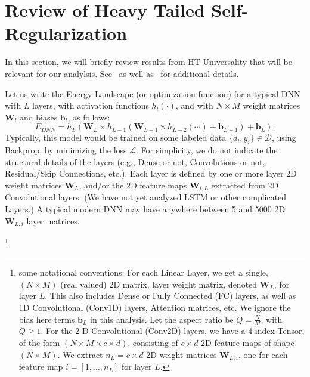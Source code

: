 
\section{Review of Heavy Tailed Self-Regularization}
\label{sxn:theory-review}

In this section, we will briefly review results from HT Universality that will be relevant for our analylsis.
See~\cite{SornetteBook,BouchaudPotters03} as well as~\cite{MM18_TR} for additional details.

Let us write the Energy Landscape (or optimization function) for a typical DNN with $L$ layers, with activation functions $h_{l}(\cdot)$, and with $N\times M$ weight matrices $\mathbf{W}_{l}$ and biases $\mathbf{b}_{l}$, as follows:
\begin{equation}
E_{DNN}=h_{L}(\mathbf{W}_{L}\times h_{L-1}(\mathbf{W}_{L-1}\times h_{L-2}(\cdots)+\mathbf{b}_{L-1})+\mathbf{b}_{L})  .
\label{eqn:dnn_energy}
\end{equation}
Typically, this model would be trained on some labeled data $\{d_{i},y_{i}\}\in\mathcal{D}$, using Backprop, by minimizing the loss $\mathcal{L}$.
For simplicity, we do not indicate the structural details of the layers (e.g., Dense or not, Convolutions or not, Residual/Skip Connections, etc.). 
Each layer is defined by one or more layer 2D weight matrices $\mathbf{W}_{L}$, and/or the 2D feature maps $\mathbf{W}_{i,L}$ extracted from 2D Convolutional layers.
(We have not yet analyzed LSTM or other complicated Layers.) 
A typical modern DNN may have anywhere between 5 and 5000 2D $\mathbf{W}_{L,i}$ layer matrices.  

\footnote{some notational conventions:
For each Linear Layer, we get a  single, $(N\times M)$ (real valued) 2D matrix, layer weight matrix, denoted $\mathbf{W}_{L}$, for layer $L$.  
This also includes Dense or Fully Connected (FC) layers, as well as 1D Convolutional (Conv1D) layers, Attention matrices, etc.
We ignore the bias here terms $\mathbf{b}_{L}$ in this analysis. 
Let the aspect ratio be $Q=\frac{N}{M}$, with $Q\ge 1$.
For the 2-D Convolutional (Conv2D) layers, we have a 4-index Tensor, of the form $(N\times M \times c\times d)$, consisting
of $c\times d$ 2D feature maps of shape $(N\times M)$.    
We  extract $n_{L}=c\times d$  2D  weight matrices $\mathbf{W}_{L,i}$, one for each feature map $i=[1,\dots,n_{L}]$ for layer $L$.
}
   
